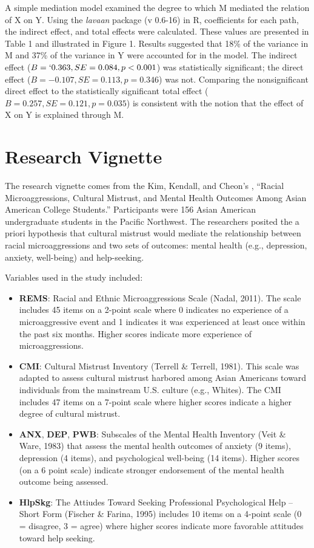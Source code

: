 \documentclass[
  11pt,
]{book}
\providecommand{\tightlist}{%
  \setlength{\itemsep}{0pt}\setlength{\parskip}{0pt}}
\begin{document}
A simple mediation model examined the degree to which M mediated the relation of X on Y. Using the \emph{lavaan} package (v 0.6-16) in R, coefficients for each path, the indirect effect, and total effects were calculated. These values are presented in Table 1 and illustrated in Figure 1. Results suggested that 18\% of the variance in M and 37\% of the variance in Y were accounted for in the model. The indirect effect (\(B = `0.363, SE = 0.084, p < 0.001\)) was statistically significant; the direct effect (\(B = -0.107, SE = 0.113, p = 0.346\)) was not. Comparing the nonsignificant direct effect to the statistically significant total effect (\(B = 0.257, SE = 0.121, p = 0.035\)) is consistent with the notion that the effect of X on Y is explained through M.

\hypertarget{research-vignette-4}{%
\section{Research Vignette}\label{research-vignette-4}}

The research vignette comes from the Kim, Kendall, and Cheon's \citeyearpar{kim_racial_2017}, ``Racial Microaggressions, Cultural Mistrust, and Mental Health Outcomes Among Asian American College Students.'' Participants were 156 Asian American undergraduate students in the Pacific Northwest. The researchers posited the a priori hypothesis that cultural mistrust would mediate the relationship between racial microaggressions and two sets of outcomes: mental health (e.g., depression, anxiety, well-being) and help-seeking.

Variables used in the study included:

\begin{itemize}
\tightlist
\item
  \textbf{REMS}: Racial and Ethnic Microaggressions Scale (Nadal, 2011). The scale includes 45 items on a 2-point scale where 0 indicates no experience of a microaggressive event and 1 indicates it was experienced at least once within the past six months. Higher scores indicate more experience of microaggressions.
\item
  \textbf{CMI}: Cultural Mistrust Inventory (Terrell \& Terrell, 1981). This scale was adapted to assess cultural mistrust harbored among Asian Americans toward individuals from the mainstream U.S. culture (e.g., Whites). The CMI includes 47 items on a 7-point scale where higher scores indicate a higher degree of cultural mistrust.
\item
  \textbf{ANX}, \textbf{DEP}, \textbf{PWB}: Subscales of the Mental Health Inventory (Veit \& Ware, 1983) that assess the mental health outcomes of anxiety (9 items), depression (4 items), and psychological well-being (14 items). Higher scores (on a 6 point scale) indicate stronger endorsement of the mental health outcome being assessed.
\item
  \textbf{HlpSkg}: The Attiudes Toward Seeking Professional Psychological Help -- Short Form (Fischer \& Farina, 1995) includes 10 items on a 4-point scale (0 = disagree, 3 = agree) where higher scores indicate more favorable attitudes toward help seeking.
\end{itemize}
\end{document}

